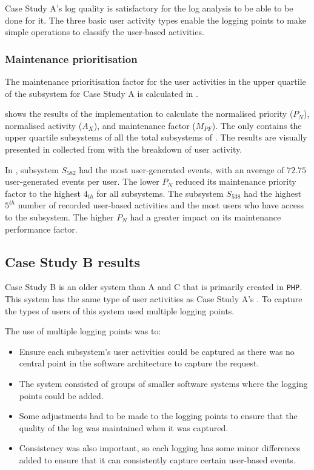 Case Study A's log quality is satisfactory for the log analysis to be able to be done for it. The three basic user activity types enable the logging points to make simple operations to classify the user-based activities. 

\subsubsection{Maintenance prioritisation}
The maintenance prioritisation factor for the user activities in the upper quartile of the subsystem for Case Study A is calculated in .



 shows the results of the implementation  to calculate the normalised priority ($P_N$), normalised activity ($A_X$), and maintenance factor ($M_{PF}$). The  only contains the upper quartile subsystems of all the total subsystems of . The results are visually presented in  collected from  with the breakdown of user activity. \par In , subsystem $S_{582}$ had the most user-generated events, with an average of $72.75$ user-generated events per user. The lower $P_N$ reduced its maintenance priority factor to the highest $4_{th}$ for all subsystems. The subsystem $S_{538}$ had the highest $5^{th}$ number of recorded user-based activities and the most users who have access to the subsystem. The higher $P_N$ had a greater impact on its maintenance performance factor. 

\clearpage

\subsection{Case Study B results}\label{sec:ch3_csB}
Case Study B is an older system than A and C that is primarily created in \texttt{PHP}. This system has the same type of user activities as Case Study A's . To capture the types of users of  this system used multiple logging points.\par The use of multiple logging points was to:

\begin{itemize}
	\item Ensure each subsystem's user activities could be captured as there was no central point in the software architecture to capture the request. 
	\item The system consisted of groups of smaller software systems where the logging points could be added.
	\item Some adjustments had to be made to the logging points to ensure that the quality of the log was maintained when it was captured. 
	\item Consistency was also important, so each logging has some minor differences added to ensure that it can consistently capture certain user-based events. \
\end{itemize}

